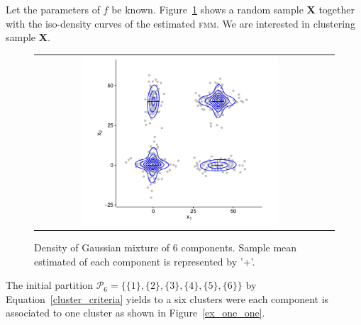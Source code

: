 \documentclass[submit]{smj}
\theoremstyle{definition}
\newcommand{\fmm}{\textsc{fmm}\xspace}
\begin{document}
Let the parameters of $f$ be known. Figure~\ref{ex_mixture} shows a random sample \textbf{X} together with the iso-density curves of the estimated \fmm. We are interested in clustering sample \textbf{X}.

\begin{figure}[htbp]
\begin{center}
\begin{tabular}{cc}
  \includegraphics[width=0.7\textwidth]{figures/partition-example-mixture.pdf} \\
 \end{tabular}
 \caption{Density of Gaussian mixture of 6 components. Sample mean estimated of each component is represented by '+'.}\label{ex_mixture}
\end{center}
\end{figure}

The initial partition  $\mathcal{P}_6 = \{ \{1\},\{2\}, \{3\}, \{4\}, \{5\}, \{6\} \}$  by Equation~\ref{cluster_criteria} yields to a six clusters were each component is associated to one cluster as shown in Figure~\ref{ex_one_one}.
\end{document}
